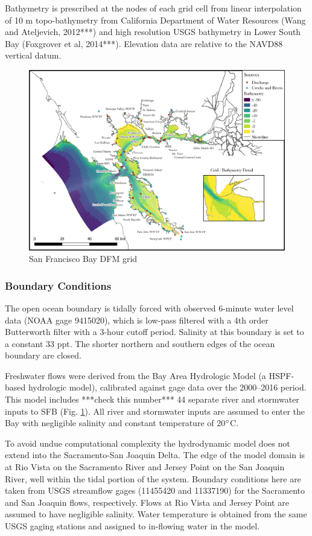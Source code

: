 \documentclass[preprint,review,12pt]{elsarticle}
\begin{document}
Bathymetry is prescribed at the nodes of each grid cell from linear interpolation of 10 m topo-bathymetry from California Department of Water Resources (Wang and Ateljevich, 2012***) and high resolution USGS bathymetry in Lower South Bay (Foxgrover et al, 2014***). Elevation data are relative to the NAVD88 vertical datum. 

\begin{figure}[ht!]
\centering
\includegraphics[width=\textwidth]{Figures/grid_inputs_v21.png}
\caption{San Francisco Bay DFM grid}
\label{fig:grid}
\end{figure}
\FloatBarrier

\subsubsection{Boundary Conditions}
The open ocean boundary is tidally forced with observed 6-minute water level data (NOAA gage 9415020), which is low-pass filtered with a 4th order Butterworth filter with a 3-hour cutoff period. Salinity at this boundary is set to a constant 33 ppt. The shorter northern and southern edges of the ocean boundary are closed.

Freshwater flows were derived from the Bay Area Hydrologic Model (a HSPF-based hydrologic model), calibrated against gage data over the 2000–2016 period. This model includes ***check this number*** 44 separate river and stormwater inputs to SFB (Fig. \ref{fig:grid}). All river and stormwater inputs are assumed to enter the Bay with negligible salinity and constant temperature of 20\(\degree\)C.

To avoid undue computational complexity the hydrodynamic model does not extend into the Sacramento-San Joaquin Delta. The edge of the model domain is at Rio Vista on the Sacramento River and Jersey Point on the San Joaquin River, well within the tidal portion of the system. Boundary conditions here are taken from USGS streamflow gages (11455420 and 11337190) for the Sacramento and San Joaquin flows, respectively. Flows at Rio Vista and Jersey Point are assumed to have negligible salinity. Water temperature is obtained from the same USGS gaging stations and assigned to in-flowing water in the model.
\end{document}
